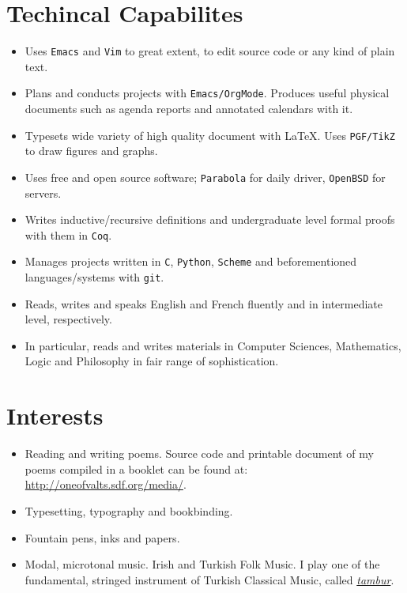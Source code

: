 \documentclass[11pt, a4paper, twocolumn]{memoir}
\begin{document}
\section*{Techincal Capabilites}
\begin{itemize}[leftmargin=*]
  \item Uses \texttt{Emacs} and \texttt{Vim} to great extent, to edit
        source code or any kind of plain text.
  \item Plans and conducts projects with \texttt{Emacs/OrgMode}.
        Produces useful physical documents such as agenda reports and
        annotated calendars with it.
  \item Typesets wide variety of high quality document with \LaTeX. Uses
        \texttt{PGF/TikZ} to draw figures and graphs.
  \item Uses free and open source software; \texttt{Parabola} for daily
        driver, \texttt{OpenBSD} for servers.
  \item Writes inductive/recursive definitions and undergraduate level
        formal proofs with them in \texttt{Coq}.
  \item Manages projects written in \texttt{C}, \texttt{Python},
        \texttt{Scheme} and beforementioned languages/systems with
        \texttt{git}.
  \item Reads, writes and speaks English and French fluently and in
        intermediate level, respectively.
  \item In particular, reads and writes materials in Computer Sciences,
        Mathematics, Logic and Philosophy in fair range of sophistication.
\end{itemize}
\section*{Interests}
\begin{itemize}[leftmargin=*]
  \item Reading and writing poems. Source code and printable document of my
        poems compiled in a booklet can be found at:
        \url{http://oneofvalts.sdf.org/media/}.
  \item Typesetting, typography and bookbinding.
  \item Fountain pens, inks and papers.
  \item Modal, microtonal music. Irish and Turkish Folk Music. I play one
        of the fundamental, stringed instrument of Turkish Classical Music,
        called
        \href{https://en.wikipedia.org/wiki/Turkish_tambur}{\textit{tambur}}.
\end{itemize}
\end{document}
